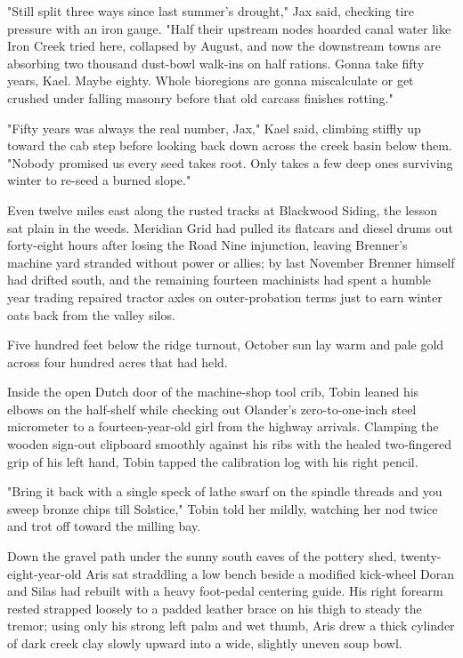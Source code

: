 "Still split three ways since last summer's drought," Jax said, checking tire pressure with an iron gauge. "Half their upstream nodes hoarded canal water like Iron Creek tried here, collapsed by August, and now the downstream towns are absorbing two thousand dust-bowl walk-ins on half rations. Gonna take fifty years, Kael. Maybe eighty. Whole bioregions are gonna miscalculate or get crushed under falling masonry before that old carcass finishes rotting."

"Fifty years was always the real number, Jax," Kael said, climbing stiffly up toward the cab step before looking back down across the creek basin below them. "Nobody promised us every seed takes root. Only takes a few deep ones surviving winter to re-seed a burned slope."

Even twelve miles east along the rusted tracks at Blackwood Siding, the lesson sat plain in the weeds. Meridian Grid had pulled its flatcars and diesel drums out forty-eight hours after losing the Road Nine injunction, leaving Brenner's machine yard stranded without power or allies; by last November Brenner himself had drifted south, and the remaining fourteen machinists had spent a humble year trading repaired tractor axles on outer-probation terms just to earn winter oats back from the valley silos.

Five hundred feet below the ridge turnout, October sun lay warm and pale gold across four hundred acres that had held.

Inside the open Dutch door of the machine-shop tool crib, Tobin leaned his elbows on the half-shelf while checking out Olander's zero-to-one-inch steel micrometer to a fourteen-year-old girl from the highway arrivals. Clamping the wooden sign-out clipboard smoothly against his ribs with the healed two-fingered grip of his left hand, Tobin tapped the calibration log with his right pencil.

"Bring it back with a single speck of lathe swarf on the spindle threads and you sweep bronze chips till Solstice," Tobin told her mildly, watching her nod twice and trot off toward the milling bay.

Down the gravel path under the sunny south eaves of the pottery shed, twenty-eight-year-old Aris sat straddling a low bench beside a modified kick-wheel Doran and Silas had rebuilt with a heavy foot-pedal centering guide. His right forearm rested strapped loosely to a padded leather brace on his thigh to steady the tremor; using only his strong left palm and wet thumb, Aris drew a thick cylinder of dark creek clay slowly upward into a wide, slightly uneven soup bowl.

